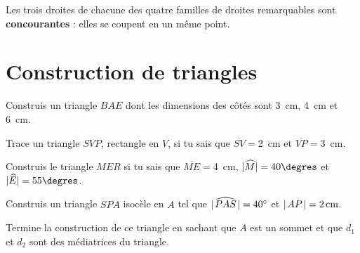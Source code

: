 \documentclass[../../syllabus_1.tex]{subfiles}
\begin{document}
Les trois droites de chacune des quatre familles de droites remarquables
sont \textbf{concourantes} : elles se coupent en un même point.

\section{Construction de triangles}

\begin{exercise}
    Construis un triangle $BAE$ dont les dimensions des côtés sont \SI{3}{cm}, \SI{4}{cm} et \SI{6}{cm}.
    \vspace{4cm}
\end{exercise}

\begin{exercise}
    Trace un triangle $SVP$, rectangle en $V$, si tu sais que $\overline{SV}=$\SI{2}{cm} et $\overline{VP}=$\SI{3}{cm}.
    \vspace{4cm}
\end{exercise}

\begin{exercise}
    Construis le triangle $MER$ si tu sais que $\overline{ME}=$\SI{4}{cm}, $|\widehat{M}|=40\degres$ et $|\widehat{E}|= 55\degres$.
    \vspace{7cm}
\end{exercise}

\begin{exercise}
    Construis un triangle $SPA$ isocèle en $A$ tel que $\lvert\mkern2mu\widehat{PAS}\mkern2mu\rvert=\ang{40}$ et $\lvert\mkern2muAP\mkern2mu\rvert= \qty{2}{cm}$.
\end{exercise}

\begin{exercise}
    Termine la construction de ce triangle en sachant que $A$ est un sommet et
    que $d_1$ et $d_2$ sont des médiatrices du triangle.
    \begin{center}
    \end{center}
\end{exercise}
\end{document}
